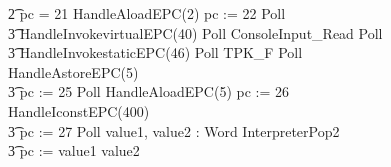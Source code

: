 \begin{figure}[t]
\begin{circus}
    \t2 {} \circelse pc = 21 \circthen HandleAloadEPC(2) \circseq pc := 22 \circseq Poll \circseq \\
    \t3 HandleInvokevirtualEPC(40) \circseq Poll \circseq ConsoleInput\_Read \circseq Poll \circseq \\
    \t3 HandleInvokestaticEPC(46) \circseq Poll \circseq TPK\_F \circseq Poll \circseq HandleAstoreEPC(5) \circseq \\
    \t3 pc := 25 \circseq Poll \circseq HandleAloadEPC(5) \circseq pc := 26 \circseq HandleIconstEPC(400) \circseq \\
    \t3 pc := 27 \circseq Poll \circseq \circvar value1, value2 : Word \circspot InterpreterPop2 \circseq \\
    \t3 pc := \IF value1 \leq value2   \\

\end{circus}
\end{figure}
